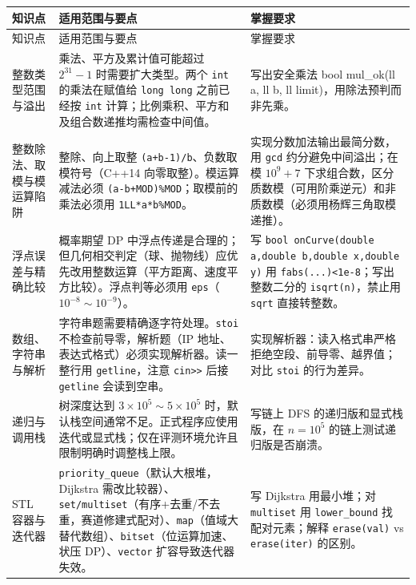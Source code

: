 \documentclass[a4paper,11pt]{article}
\newcommand{\code}[1]{\texttt{#1}}
\begin{document}
\begin{longtable}{L{2.4cm} L{7.5cm} L{6.8cm}}
\toprule
知识点 & 适用范围与要点 & 掌握要求 \\
\midrule
\endfirsthead
\toprule
知识点 & 适用范围与要点 & 掌握要求 \\
\midrule
\endhead
\endfoot
\bottomrule
\endlastfoot

整数类型范围与溢出
& 乘法、平方及累计值可能超过 $2^{31}-1$ 时需要扩大类型。两个 \code{int} 的乘法在赋值给 \code{long long} 之前已经按 \code{int} 计算；比例乘积、平方和及组合数递推均需检查中间值。
& 写出安全乘法 {\ttfamily bool mul\_ok(ll a, ll b, ll limit)}，用除法预判而非先乘。\\[2mm]

整数除法、取模与模运算陷阱
& 整除、向上取整 \code{(a+b-1)/b}、负数取模符号（C++14 向零取整）。模运算减法必须 \code{(a-b+MOD)\%MOD}；取模前的乘法必须用 \code{1LL*a*b\%MOD}。
& 实现分数加法输出最简分数，用 \code{gcd} 约分避免中间溢出；在模 $10^9+7$ 下求组合数，区分质数模（可用阶乘逆元）和非质数模（必须用杨辉三角取模递推）。\\[2mm]

浮点误差与精确比较
& 概率期望 DP 中浮点传递是合理的；但几何相交判定（球、抛物线）应优先改用整数运算（平方距离、速度平方比较）。浮点判等必须用 \code{eps}（$10^{-8}\sim10^{-9}$）。
& 写 \code{bool onCurve(double a,double b,double x,double y)} 用 \code{fabs(...)<1e-8}；写出整数二分的 \code{isqrt(n)}，禁止用 \code{sqrt} 直接转整数。\\[2mm]

数组、字符串与解析
& 字符串题需要精确逐字符处理。\code{stoi} 不检查前导零，解析题（IP 地址、表达式格式）必须实现解析器。读一整行用 \code{getline}，注意 \code{cin>>} 后接 \code{getline} 会读到空串。
& 实现解析器：读入格式串严格拒绝空段、前导零、越界值；对比 \code{stoi} 的行为差异。\\[2mm]

递归与调用栈
& 树深度达到 $3\times10^5\sim5\times10^5$ 时，默认栈空间通常不足。正式程序应使用迭代或显式栈；仅在评测环境允许且限制明确时调整栈上限。
& 写链上 DFS 的递归版和显式栈版，在 $n=10^5$ 的链上测试递归版是否崩溃。\\[2mm]

STL 容器与迭代器
& \code{priority\_queue}（默认大根堆，Dijkstra 需改比较器）、\code{set/multiset}（有序+去重/不去重，赛道修建式配对）、\code{map}（值域大替代数组）、\code{bitset}（位运算加速、状压 DP）、\code{vector} 扩容导致迭代器失效。
& 写 Dijkstra 用最小堆；对 \code{multiset} 用 \code{lower\_bound} 找配对元素；解释 \code{erase(val)} vs \code{erase(iter)} 的区别。\\[2mm]


\end{longtable}
\end{document}
